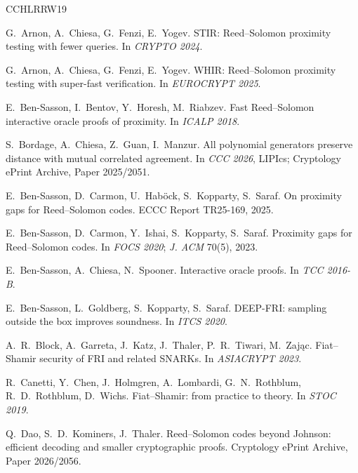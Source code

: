 \begin{thebibliography}{CCHLRRW19}
\raggedright

G.~Arnon, A.~Chiesa, G.~Fenzi, E.~Yogev.
\newblock STIR: Reed--Solomon proximity testing with fewer queries.
\newblock In \emph{CRYPTO 2024}.

G.~Arnon, A.~Chiesa, G.~Fenzi, E.~Yogev.
\newblock WHIR: Reed--Solomon proximity testing with super-fast verification.
\newblock In \emph{EUROCRYPT 2025}.

E.~Ben-Sasson, I.~Bentov, Y.~Horesh, M.~Riabzev.
\newblock Fast Reed--Solomon interactive oracle proofs of proximity.
\newblock In \emph{ICALP 2018}.

S.~Bordage, A.~Chiesa, Z.~Guan, I.~Manzur.
\newblock All polynomial generators preserve distance with mutual correlated agreement.
\newblock In \emph{CCC 2026}, LIPIcs; Cryptology ePrint Archive, Paper 2025/2051.

E.~Ben-Sasson, D.~Carmon, U.~Hab\"ock, S.~Kopparty, S.~Saraf.
\newblock On proximity gaps for Reed--Solomon codes.
\newblock ECCC Report TR25-169, 2025.

E.~Ben-Sasson, D.~Carmon, Y.~Ishai, S.~Kopparty, S.~Saraf.
\newblock Proximity gaps for Reed--Solomon codes.
\newblock In \emph{FOCS 2020}; \emph{J. ACM} 70(5), 2023.

E.~Ben-Sasson, A.~Chiesa, N.~Spooner.
\newblock Interactive oracle proofs.
\newblock In \emph{TCC 2016-B}.

E.~Ben-Sasson, L.~Goldberg, S.~Kopparty, S.~Saraf.
\newblock DEEP-FRI: sampling outside the box improves soundness.
\newblock In \emph{ITCS 2020}.

A.~R.~Block, A.~Garreta, J.~Katz, J.~Thaler, P.~R.~Tiwari, M.~Zaj\k{a}c.
\newblock Fiat--Shamir security of FRI and related SNARKs.
\newblock In \emph{ASIACRYPT 2023}.

R.~Canetti, Y.~Chen, J.~Holmgren, A.~Lombardi, G.~N.~Rothblum, R.~D.~Rothblum, D.~Wichs.
\newblock Fiat--Shamir: from practice to theory.
\newblock In \emph{STOC 2019}.

Q.~Dao, S.~D.~Kominers, J.~Thaler.
\newblock Reed--Solomon codes beyond Johnson: efficient decoding and smaller cryptographic proofs.
\newblock Cryptology ePrint Archive, Paper 2026/2056.


\end{thebibliography}
